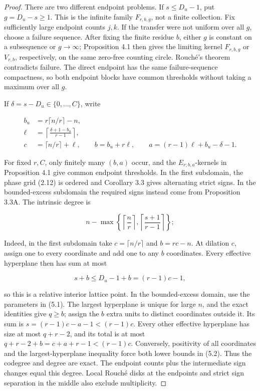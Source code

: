 \documentclass[10pt]{article}
\begin{document}
\begin{proof}


There are two different endpoint problems.  If $s\le D_u-1$, put
$g=D_u-s\ge1$.  This is the infinite family $F_{r,b,g}$, not a finite
collection.  Fix sufficiently large endpoint counts $j,k$.  If the transfer
were not uniform over all $g$, choose a failure sequence.  After fixing the
finite residue $b$, either $g$ is constant on a subsequence or
$g\to\infty$; Proposition 4.1 then gives the limiting kernel
$F_{r,b,g}$ or $V_{r,b}$, respectively, on the same zero-free counting
circle.  Rouché's theorem contradicts failure.  The direct endpoint has the
same failure-sequence compactness, so both endpoint blocks have common
thresholds without taking a maximum over all $g$.

If $\delta=s-D_u\in\{0,\ldots,C\}$, write

\[
 \begin{aligned}
 b_u&=r\lceil n/r\rceil-n,\\
 \ell&=\left\lceil\frac{\delta+1-b_u}{r-1}\right\rceil,\\
 c&=\lceil n/r\rceil+\ell,\qquad
 b=b_u+r\ell,\qquad
 a=(r-1)\ell+b_u-\delta-1.
 \end{aligned} \tag{5.1}
\]

For fixed $r,C$, only finitely many $(b,a)$ occur, and the
$E_{r;b,a}$-kernels in Proposition 4.1 give common endpoint thresholds.
In the first subdomain, the phase grid (2.12) is ordered and Corollary 3.3
gives alternating strict signs.  In the bounded-excess subdomain the required
signs instead come from Proposition 3.3A.  The intrinsic degree is

\[
 n-\max\left\{\left\lceil\frac nr\right\rceil,
 \left\lceil\frac{s+1}{r-1}\right\rceil\right\}; \tag{5.2}
\]

Indeed, in the first subdomain take $c=\lceil n/r\rceil$ and
$b=rc-n$.  At dilation $c$, assign one to every coordinate and add one to
any $b$ coordinates.  Every effective hyperplane then has sum at most

\[
 s+b\le D_u-1+b=(r-1)c-1,
\]

so this is a relative interior lattice point.  In the bounded-excess domain,
use the parameters in (5.1).  The largest hyperplane is unique for large
$n$, and the exact identities give $q\ge b$; assign the $b$ extra units
to distinct coordinates outside it.  Its sum is
$s=(r-1)c-a-1<(r-1)c$.  Every other effective hyperplane has size at most
$q+r-2$, and its total is at most
$q+r-2+b=c+a+r-1<(r-1)c$.  Conversely, positivity of all coordinates and
the largest-hyperplane inequality force both lower bounds in (5.2).  Thus the
codegree and degree are exact.  The endpoint counts plus the intermediate
sign changes equal this degree.
Local Rouché disks at the endpoints and strict sign separation in the middle
also exclude multiplicity.
\end{proof}
\end{document}
